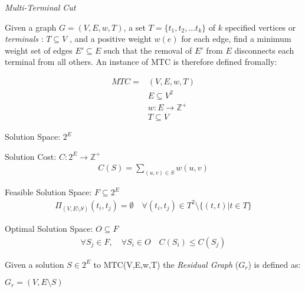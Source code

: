 \documentclass{article}
\begin{document}
\begin{definition}
{\em Multi-Terminal Cut}

Given a graph $G=(V,E,w,T)$, a set $T=\{t_1, t_2, ... t_k\}$ of $k$ specified vertices or {\em terminals} : $T \subseteq V$ , and a positive weight $w(e)$ for each edge, find a minimum weight set of edges $E' \subseteq E$ such that the removal of $E'$ from $E$ disconnects each terminal from all others.
An instance of MTC is therefore defined fromally:

\begin{align}
	\nonumber MTC = & (V,E,w,T)\\
	\nonumber & E \subseteq V^2\\
	\nonumber & w : E \rightarrow \mathbb{Z}^+\\
	\nonumber & T \subseteq V
\end{align}

Solution Space: $2^E$

Solution Cost: $C : 2^E \rightarrow \mathbb{Z}^+$
\begin{align}
	\nonumber C(S) = \displaystyle\sum\limits_{(u,v) \in S} w(u,v)
\end{align}

Feasible Solution Space: $F \subseteq 2^E$
\begin{align}
	\nonumber \Pi_{(V,E \setminus S)}(t_i, t_j) = \emptyset \quad \forall (t_i, t_j) \in T^2 \setminus \{(t, t) | t \in T\}
\end{align}

Optimal Solution Space: $O \subseteq F$
\begin{align}
	\forall S_j \in F , \quad \forall S_i \in O \quad \nonumber C(S_i) \leq C(S_j)
\end{align}

\end{definition}

\begin{definition}
Given a solution $S \in 2^E$ to MTC(V,E,w,T) the {\em Residual Graph} ($G_r$) is defined as:

$G_r = (V, E \setminus S)$
\end{definition}
\end{document}
